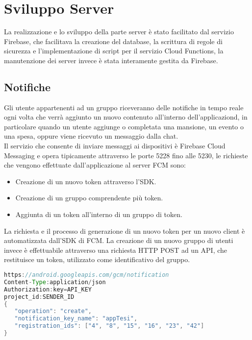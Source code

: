 \chapter{Sviluppo Server}                %
\lhead[\fancyplain{}{\bfseries\thepage}]{\fancyplain{}{\bfseries\rightmark}}
La realizzazione e lo sviluppo della parte server è stato facilitato dal servizio Firebase, che facilitava la creazione del database, la scrittura di regole di sicurezza e l'implementazione di script per il servizio Cloud Functions, la manutenzione dei server invece è stata interamente gestita da Firebase.

\section{Notifiche}
Gli utente appartenenti ad un gruppo riceveranno delle notifiche in tempo reale ogni volta che verrà aggiunto un nuovo contenuto all'interno dell'applicaziond, in particolare quando un utente aggiunge o completata una mansione, un evento o una spesa, oppure viene ricevuto un messaggio dalla chat.\\
Il servizio che consente di inviare messaggi ai dispositivi è Firebase Cloud Messaging e opera tipicamente attraverso le porte 5228 fino alle 5230, le richieste che vengono effettuate dall'applicazione al server FCM sono:
\begin{itemize}
    \item Creazione di un nuovo token attraverso l'SDK.
    \item Creazione di un gruppo comprendente più token.
    \item Aggiunta di un token all'interno di un gruppo di token.
\end{itemize}

La richiesta e il processo di generazione di un nuovo token per un nuovo client è automatizzata dall'SDK di FCM.
La creazione di un nuovo gruppo di utenti invece è effettuabile attraverso una richiesta HTTP POST ad un API, che restituisce un token, utilizzato come identificativo del gruppo.

\begin{lstlisting}[language=java,caption={Creazione di un token per il servizio FCM}]
https://android.googleapis.com/gcm/notification
Content-Type:application/json
Authorization:key=API_KEY
project_id:SENDER_ID
{
   "operation": "create",
   "notification_key_name": "appTesi",
   "registration_ids": ["4", "8", "15", "16", "23", "42"]
}
\end{lstlisting}

